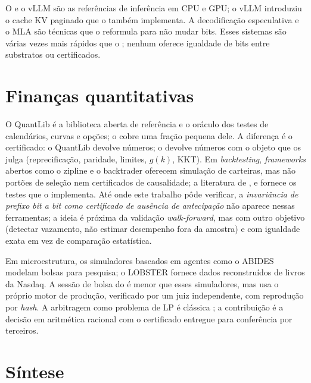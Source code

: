 O  e o vLLM \cite{kwon2023} são as referências de inferência em CPU e GPU; o vLLM introduziu o cache KV paginado que o \vapor{} também implementa. A decodificação especulativa \cite{leviathan2023} e o MLA \cite{deepseek2024} são técnicas que o \vapor{} reformula para não mudar bits. Esses sistemas são várias vezes mais rápidos que o \vapor{}; nenhum oferece igualdade de bits entre substratos ou certificados.

\section{Finanças quantitativas}

O QuantLib \cite{quantlib} é a biblioteca aberta de referência e o oráculo dos testes de calendários, curvas e opções; o \vapor{} cobre uma fração pequena dele. A diferença é o certificado: o QuantLib devolve números; o \vapor{} devolve números com o objeto que os julga (reprecificação, paridade, limites, $g(k)$, KKT). Em \textit{backtesting}, \textit{frameworks} abertos como o zipline e o backtrader oferecem simulação de carteiras, mas não portões de seleção nem certificados de causalidade; a literatura de ,  e  fornece os testes que o \vapor{} implementa. Até onde este trabalho pôde verificar, a \emph{invariância de prefixo bit a bit como certificado de ausência de antecipação} não aparece nessas ferramentas; a ideia é próxima da validação \textit{walk-forward}, mas com outro objetivo (detectar vazamento, não estimar desempenho fora da amostra) e com igualdade exata em vez de comparação estatística.

Em microestrutura, os simuladores baseados em agentes como o ABIDES \cite{byrd2020} modelam bolsas para pesquisa; o LOBSTER fornece dados reconstruídos de livros da Nasdaq. A sessão de bolsa do \vapor{} é menor que esses simuladores, mas usa o próprio motor de produção, verificado por um juiz independente, com reprodução por \textit{hash}. A arbitragem como problema de LP é clássica \cite{harrison1979,jouini1995}; a contribuição é a decisão em aritmética racional com o certificado entregue para conferência por terceiros.

\section{Síntese}

